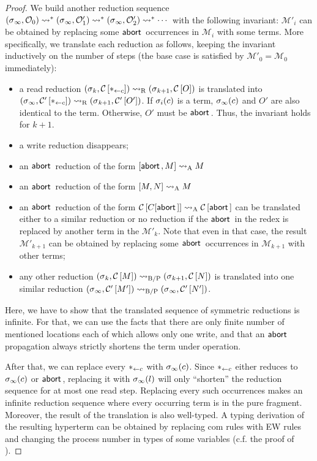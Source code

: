 {\begin{proof}
We build another reduction sequence
$
({\sigma}{_\infty},{\mathcal{O}_0})
\rightsquigarrow^\ast
({\sigma}{_\infty},{\mathcal{O}'_1})
\rightsquigarrow^\ast
({\sigma}{_\infty},{\mathcal{O}'_2})
\rightsquigarrow^\ast\cdots
$
with the following invariant:
$\mathcal M'_i$ can be obtained by replacing some $\mathsf{abort\,}$ occurrences
in $\mathcal M_i$ with some terms.
More specifically, we translate each reduction as follows, keeping the
invariant inductively on the number of steps
(the base case is satisfied by $\mathcal M'_0 = \mathcal M_0$ immediately):
\begin{itemize}
 \item a read reduction $({\sigma}{_k},{{\mathcal{C}}\left[{\ast_{\leftarrow{c}}}\right]})
       \rightsquigarrow_{\mathrm R}
       ({\sigma}{_{k+1}},{{\mathcal{C}}\left[{O}\right]})$ is translated into
       $({\sigma}{_\infty},{{\mathcal{C}'}\left[{\ast_{\leftarrow{c}}}\right]}) \rightsquigarrow_{\mathrm R}
       ({\sigma}{_{k+1}},{{\mathcal{C}'}\left[{O'}\right]})$.
       If ${\sigma}_i(c)$ is a term,
       ${\sigma}_\infty(c)$ and $O'$ are also identical to the term.
       Otherwise, $O'$ must be $\mathsf{abort\,}$.
       Thus, the invariant
       holds for $k+1$.
 \item a write reduction disappears;
 \item an $\mathsf{abort\,}$ reduction of the form $[{\mathsf{abort\,}, M}]\rightsquigarrow_{\mathrm A} M$
 \item an $\mathsf{abort\,}$ reduction of the form $[{M, N}]\rightsquigarrow_{\mathrm A} M$
 \item an $\mathsf{abort\,}$ reduction of the form
       ${\mathcal{C}}\left[{C[\mathsf{abort\,}]}\right] \rightsquigarrow_{\mathrm A} {\mathcal{C}}\left[{\mathsf{abort\,}}\right]$ can be translated
       either to a similar reduction or no reduction if the $\mathsf{abort\,}$ in
       the redex is replaced by another term in the $\mathcal{M'}_k$.
       Note that even in that case, the result $\mathcal{M'}_{k+1}$ can
       be obtained by replacing some $\mathsf{abort\,}$ occurrences in
       $\mathcal{M}_{k+1}$ with other terms;
 \item any other reduction $({\sigma}{_k},{{\mathcal{C}}\left[{M}\right]}) \rightsquigarrow_{\mathrm{B/P}}
       ({\sigma}{_{k+1}},{{\mathcal{C}}\left[{N}\right]})$
       is translated into one similar reduction
       $({\sigma}{_\infty},{{\mathcal{C}'}\left[{M'}\right]})\rightsquigarrow_{\mathrm{B/P}}
        ({\sigma}{_\infty},{{\mathcal{C}'}\left[{N'}\right]})$.
\end{itemize}
Here, we have to show that the translated sequence of symmetric
reductions is infinite.
For that, we can use the facts that there are only finite
number of mentioned locations each of which allows only one write,
 and that an $\mathsf{abort\,}$ propagation always
strictly shortens the term under operation.

 After that, we can replace
 every ${\ast_{\leftarrow{c}}}$ with
 ${\sigma}_\infty(c)$.
 Since $\ast_{\leftarrow{c}}$ either reduces to ${\sigma}_\infty(c)$ or $\mathsf{abort\,}$,
 replacing it with ${\sigma}_\infty(l)$ will only ``shorten'' the reduction
 sequence for at most one read step.
 Replacing every such occurrences
 makes an infinite reduction sequence where every occurring term is
 in the pure fragment.
 Moreover,
 the result of the translation is also well-typed.
 A typing derivation of the resulting hyperterm can be obtained by
 replacing com rules with EW rules and changing the process number in
 types of some variables (c.f. the proof of ).


\end{proof}}
